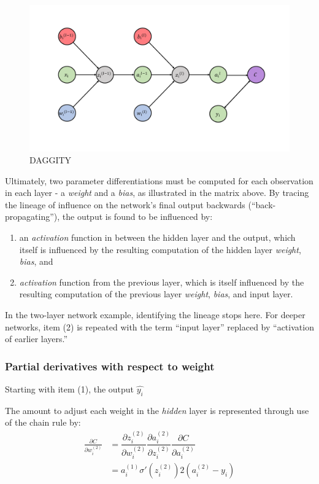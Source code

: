 \begin{figure}[H]
\centering
    \vspace{-20pt}
    \includegraphics[width = .6\textwidth]{Figures/BackpropDAG.pdf}
    \caption{\footnotesize DAGGITY}
    \label{backpropDAG}
    \vspace{-20pt}
\end{figure}

Ultimately, two parameter
differentiations must be computed for each observation in each layer - a
\emph{weight} and a \emph{bias}, as illustrated in the matrix above. By tracing the lineage of influence on the
network's final output backwards
(``back-propagating''), the output is found to be influenced by:

\begin{enumerate}
\tightlist
\item
  an \textit{activation} function in between the hidden layer and the output,
  which itself is influenced by the resulting computation of the hidden layer \emph{weight}, \emph{bias}, and
\item
  \textit{activation} function from the previous layer, which is itself
  influenced by the resulting computation of the previous layer
  \emph{weight}, \emph{bias}, and input layer.
\end{enumerate}

In the two-layer network example, identifying the lineage stops here.  For deeper networks, item (2) is repeated with the term ``input layer'' replaced by ``activation of earlier layers.''




\subsubsection{Partial derivatives with respect to
weight}

Starting with item (1), the output $\hat{y_i}$

The amount to adjust each weight in the \emph{hidden} layer is
represented through use of the chain rule by:
\begin{align*}
\frac{\partial{C}}{\partial{w_i^{(2)}}}    &=  \dfrac{\partial{z_i^{(2)}}}{\partial{w_i^{(2)}}}
     \dfrac{\partial{a_i^{(2)}}}{\partial{z_i^{(2)}}}
     \dfrac{\partial{C}}{\partial{a_i^{(2)}}} \\ 
 &= a_i^{(1)} \sigma'(z_i^{(2)}) 2(a_i^{(2)}-y_i) \end{align*}

